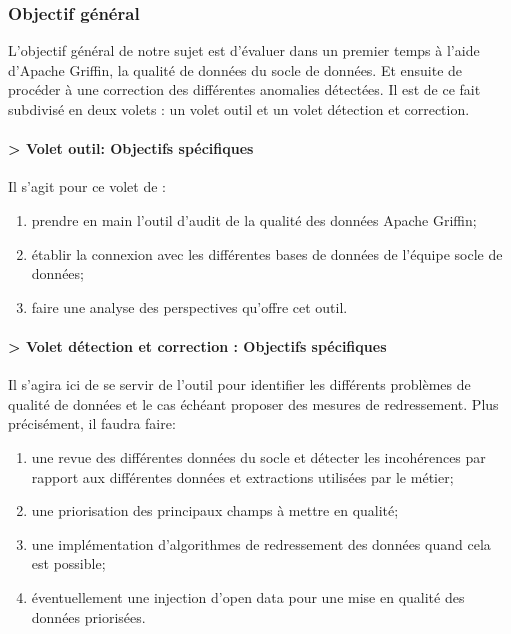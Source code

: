 \subsubsection{\textbf{Objectif g\'en\'eral}}

L'objectif g\'en\'eral de notre sujet est d'évaluer dans un premier temps à l’aide d’Apache Griffin, la qualité de données du socle de données. Et ensuite de proc\'eder \`a une correction des diff\'erentes anomalies d\'etect\'ees. Il est de ce fait subdivis\'e en deux volets : un volet outil et un volet d\'etection et correction.

\paragraph{\textbf{> Volet outil: Objectifs sp\'ecifiques } }
Il s'agit pour ce volet de :
\begin{enumerate}[parsep=0cm,itemsep=0cm]
\item prendre en main l'outil d'audit de la qualit\'e des donn\'ees Apache Griffin;
\item \'etablir la connexion avec les diff\'erentes bases de donn\'ees de l'\'equipe socle de donn\'ees;
\item faire une analyse des perspectives qu'offre cet outil.
\end{enumerate}

\paragraph{\textbf{> Volet d\'etection et correction : Objectifs sp\'ecifiques }}
Il  s'agira ici de se servir de l'outil pour identifier les diff\'erents probl\`emes de qualit\'e de donn\'ees et le cas \'ech\'eant proposer des mesures de redressement. Plus précisément, il faudra faire:
\begin{enumerate}[parsep=0cm,itemsep=0cm]
\item une revue des diff\'erentes donn\'ees du socle et d\'etecter les incoh\'erences par rapport aux diff\'erentes donn\'ees et extractions utilis\'ees par le m\'etier; 
\item une priorisation des principaux champs \`a mettre en qualit\'e; %
\item une impl\'ementation d'algorithmes de redressement des donn\'ees quand cela est possible; 
\item \'eventuellement une injection d'open data pour une mise en qualit\'e des donn\'ees prioris\'ees.
\end{enumerate}

